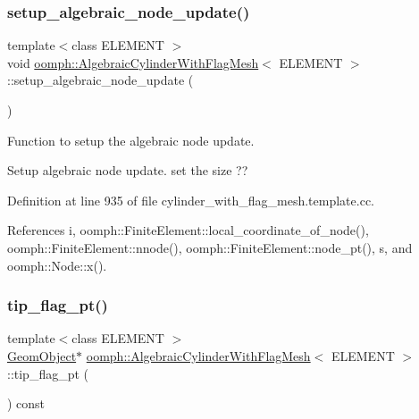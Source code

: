 \subsubsection{\texorpdfstring{setup\+\_\+algebraic\+\_\+node\+\_\+update()}{setup\_algebraic\_node\_update()}}
{\footnotesize\ttfamily template$<$class E\+L\+E\+M\+E\+NT $>$ \\
void \hyperlink{classoomph_1_1AlgebraicCylinderWithFlagMesh}{oomph\+::\+Algebraic\+Cylinder\+With\+Flag\+Mesh}$<$ E\+L\+E\+M\+E\+NT $>$\+::setup\+\_\+algebraic\+\_\+node\+\_\+update (\begin{DoxyParamCaption}{ }\end{DoxyParamCaption})\hspace{0.3cm}{\ttfamily [protected]}}



Function to setup the algebraic node update. 

Setup algebraic node update. set the size ?? 

Definition at line 935 of file cylinder\+\_\+with\+\_\+flag\+\_\+mesh.\+template.\+cc.



References i, oomph\+::\+Finite\+Element\+::local\+\_\+coordinate\+\_\+of\+\_\+node(), oomph\+::\+Finite\+Element\+::nnode(), oomph\+::\+Finite\+Element\+::node\+\_\+pt(), s, and oomph\+::\+Node\+::x().

\mbox{\label{classoomph_1_1AlgebraicCylinderWithFlagMesh_ad6d22aaa02d79e3c740b06d98a1597ea}} 
\subsubsection{\texorpdfstring{tip\+\_\+flag\+\_\+pt()}{tip\_flag\_pt()}}
{\footnotesize\ttfamily template$<$class E\+L\+E\+M\+E\+NT $>$ \\
\hyperlink{classoomph_1_1GeomObject}{Geom\+Object}$\ast$ \hyperlink{classoomph_1_1AlgebraicCylinderWithFlagMesh}{oomph\+::\+Algebraic\+Cylinder\+With\+Flag\+Mesh}$<$ E\+L\+E\+M\+E\+NT $>$\+::tip\+\_\+flag\+\_\+pt (\begin{DoxyParamCaption}{ }\end{DoxyParamCaption}) const\hspace{0.3cm}{\ttfamily [inline]}}



